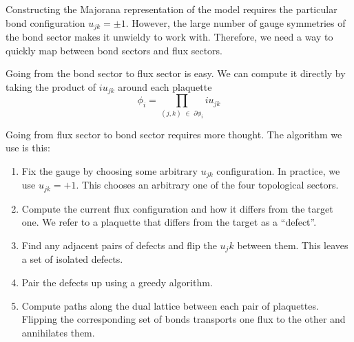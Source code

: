 Constructing the Majorana representation of the model requires the particular bond configuration \(u_{jk} = \pm 1\). However, the large number of gauge symmetries of the bond sector makes it unwieldy to work with. Therefore, we need a way to quickly map between bond sectors and flux sectors.

Going from the bond sector to flux sector is easy. We can compute it directly by taking the product of \(i u_{jk}\) around each plaquette \[ \phi_i = \prod_{(j,k) \; \in \; \partial \phi_i} i u_{jk}\]

Going from flux sector to bond sector requires more thought. The algorithm we use is this:

\begin{enumerate}
\def\labelenumi{\arabic{enumi}.}
\item
  Fix the gauge by choosing some arbitrary \(u_{jk}\) configuration. In practice, we use \(u_{jk} = +1\). This chooses an arbitrary one of the four topological sectors.
\item
  Compute the current flux configuration and how it differs from the target one. We refer to a plaquette that differs from the target as a ``defect''.
\item
  Find any adjacent pairs of defects and flip the \(u_jk\) between them. This leaves a set of isolated defects.
\item
  Pair the defects up using a greedy algorithm.
\item
  Compute paths along the dual lattice between each pair of plaquettes. Flipping the corresponding set of bonds transports one flux to the other and annihilates them.
\end{enumerate}

